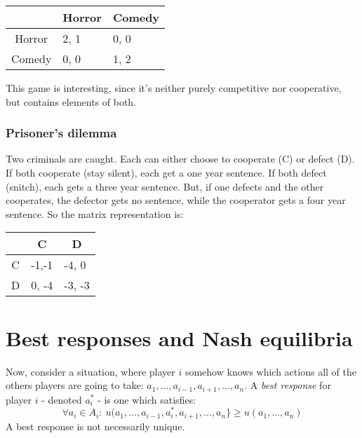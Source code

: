 \documentclass[12pt, a4paper]{article}
\begin{document}
\begin{table}[htbp]
\centering
\label{matrix:battle_of_the_sexes}
\begin{tabular}{c|l|l|}
\cline{2-3}
\multicolumn{1}{l|}{}   & \multicolumn{1}{c|}{Horror} & \multicolumn{1}{c|}{Comedy} \\ \hline
\multicolumn{1}{|c|}{Horror} & 2, 1                  & 0, 0                  \\ \hline
\multicolumn{1}{|c|}{Comedy} & 0, 0                 & 1, 2                 \\ \hline
\end{tabular}
\end{table}

This game is interesting, since it's neither purely competitive nor cooperative, but contains elements of both.

\subsubsection{Prisoner's dilemma}
Two criminals are caught. Each can either choose to cooperate (C) or defect (D). If both cooperate (stay silent), each get a one year sentence. If both defect (snitch), each gets a three year sentence. But, if one defects and the other cooperates, the defector gets no sentence, while the cooperator gets a four year sentence. So the matrix representation is:

\begin{table}[htbp]
\centering
\label{matrix:prisoners_dilemma}
\begin{tabular}{c|l|l|}
\cline{2-3}
\multicolumn{1}{l|}{}   & \multicolumn{1}{c|}{C} & \multicolumn{1}{c|}{D} \\ \hline
\multicolumn{1}{|c|}{C} & -1,-1                  & -4, 0                  \\ \hline
\multicolumn{1}{|c|}{D} & 0, -4                  & -3, -3                 \\ \hline
\end{tabular}
\end{table}


\section{Best responses and Nash equilibria}
Now, consider a situation, where player $i$ somehow knows which actions all of the others players are going to take: $a_1,\ldots, a_{i-1},a_{i+1},\ldots, a_n$. A \textit{best response} for player $i$ - denoted $a^*_i$ - is one which satisfies:
\begin{equation}
\forall a_i\in A_i:\ u(a_1,\ldots, a_{i-1},a^*_i,a_{i+1},\ldots,a_n\}\ge u(a_1,\ldots,a_n)
\end{equation}
A best response is not necessarily unique.
\end{document}
